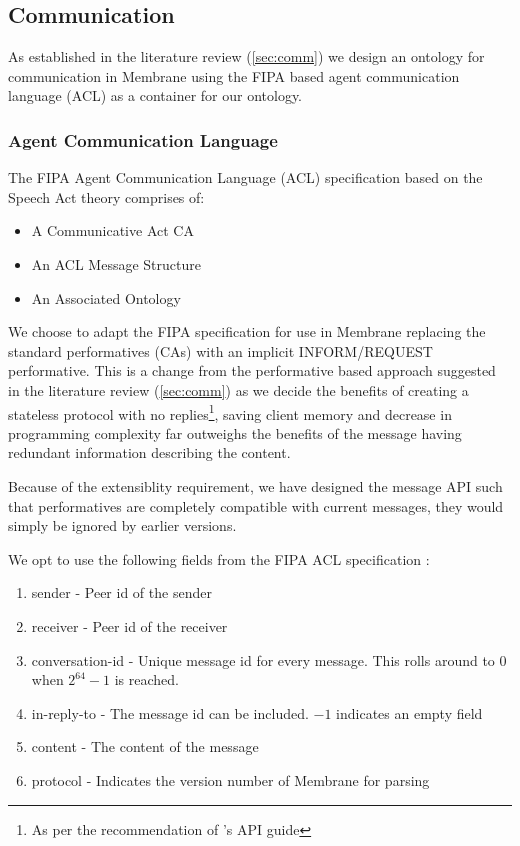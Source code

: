 \documentclass[11pt, a4paper, twocolumn, twoside]{report}
\begin{document}
\subsection{Communication}

As established in the literature review (\ref{sec:comm}) we design an ontology for communication in Membrane using the FIPA based agent communication language (ACL) as a container for our ontology.

\subsubsection{Agent Communication Language}

The FIPA Agent Communication Language (ACL) specification based on the Speech Act theory \citep{labrou1999agent} comprises of:

\begin{itemize}
 \item A Communicative Act CA
 \item An ACL Message Structure
 \item An Associated Ontology
\end{itemize}

We choose to adapt the FIPA specification for use in Membrane replacing the standard performatives (CAs) with an implicit INFORM/REQUEST performative. This is a change from the performative based approach suggested in the literature review (\ref{sec:comm}) as we decide the benefits of creating a stateless protocol with no replies\footnote{As per the recommendation of \citep{google2017api}'s API guide}, saving client memory and decrease in programming complexity far outweighs the benefits of the message having redundant information describing the content.

Because of the extensiblity requirement, we have designed the message API such that performatives are completely compatible with current messages, they would simply be ignored by earlier versions.

We opt to use the following fields from the FIPA ACL specification \citep{fipa2002fipa}:

\begin{enumerate}
 \item sender - Peer id of the sender
 \item receiver - Peer id of the receiver
 \item conversation-id - Unique message id for every message. This rolls around to $0$ when $2^{64}-1$ is reached.
 \item in-reply-to - The message id can be included. $-1$ indicates an empty field
 \item content - The content of the message
 \item protocol - Indicates the version number of Membrane for parsing
\end{enumerate}
\end{document}
